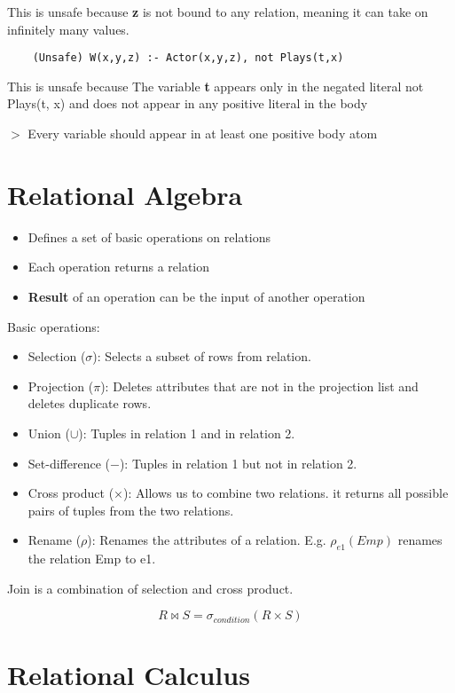 \documentclass[12pt,a4paper]{article}
\newcommand{\remark}[1]{
    $>$ {\color{blue} #1}
}
\begin{document}
This is unsafe because \textbf{z} is not bound to any relation, meaning it can take on infinitely many values.

\begin{verbatim}
    (Unsafe) W(x,y,z) :- Actor(x,y,z), not Plays(t,x)
\end{verbatim}

This is unsafe because The variable \textbf{t} appears only in the negated literal not Plays(t, x) and does not appear in any positive literal in the body

\remark{Every variable should appear in at least one positive body atom}

\section*{Relational Algebra}

\begin{itemize}
    \item Defines a set of basic operations on relations
    \item Each operation returns a relation
    \item \textbf{Result} of an operation can be the input of another operation
\end{itemize}

Basic operations:

\begin{itemize}
    \item Selection ($\sigma$): Selects a subset of rows from relation.
    \item Projection ($\pi$): Deletes attributes that are not in the projection list and deletes duplicate rows.
    \item Union ($\cup$): Tuples in relation 1 and in relation 2.
    \item Set-difference ($-$): Tuples in relation 1 but not in relation 2.
    \item Cross product ($\times$): Allows us to combine two relations. it returns all possible pairs of tuples from the two relations.
    \item Rename ($\rho$): Renames the attributes of a relation. E.g. $\rho_{e1}(Emp)$ renames the relation Emp to e1. 
\end{itemize}

Join is a combination of selection and cross product.

\[ R \bowtie S = \sigma_{condition} (R \times S) \]

\section*{Relational Calculus}
\end{document}
